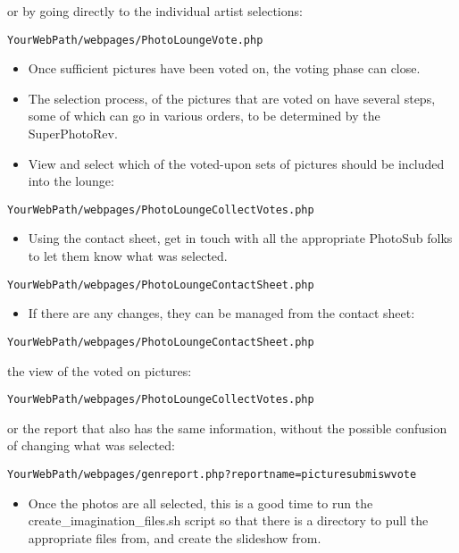 \documentclass[captions=tablesignature]{scrartcl}
\begin{document}
or by going directly to the individual artist selections:
\begin{verbatim}
YourWebPath/webpages/PhotoLoungeVote.php
\end{verbatim}
\begin{itemize}
\item Once sufficient pictures have been voted on, the voting phase can
close.
\item The selection process, of the pictures that are voted on have
several steps, some of which can go in various orders, to be
determined by the SuperPhotoRev.
\item View and select which of the voted-upon sets of pictures should be
included into the lounge:
\end{itemize}
\begin{verbatim}
YourWebPath/webpages/PhotoLoungeCollectVotes.php
\end{verbatim}
\begin{itemize}
\item Using the contact sheet, get in touch with all the appropriate
PhotoSub folks to let them know what was selected.
\end{itemize}
\begin{verbatim}
YourWebPath/webpages/PhotoLoungeContactSheet.php
\end{verbatim}
\begin{itemize}
\item If there are any changes, they can be managed from the contact
sheet:
\end{itemize}
\begin{verbatim}
YourWebPath/webpages/PhotoLoungeContactSheet.php
\end{verbatim}
the view of the voted on pictures:
\begin{verbatim}
YourWebPath/webpages/PhotoLoungeCollectVotes.php
\end{verbatim}
or the report that also has the same information, without the
possible confusion of changing what was selected:
\begin{verbatim}
YourWebPath/webpages/genreport.php?reportname=picturesubmiswvote
\end{verbatim}
\begin{itemize}
\item Once the photos are all selected, this is a good time to run the
create\_imagination\_files.sh script so that there is a directory to
pull the appropriate files from, and create the slideshow from.
\end{itemize}
\end{document}
